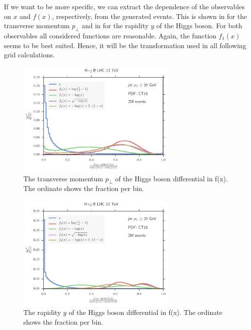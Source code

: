 If we want to be more specific, we can extract the dependence of the observables on $x$ and $f(x)$, respectively, from the generated events.
This is shown in  for the transverse momentum $p_\perp$ and in  for the rapidity $y$ of the Higgs boson.
For both observables all considered functions are reasonable.
Again, the function $f_1(x)$ seems to be best suited.
Hence, it will be the transformation used in all following grid calculations.
%
\begin{figure}[]
	\includegraphics[width=0.7\textwidth]{images/hpt_compare.pdf}
	\caption{The transverse momentum $p_\perp$ of the Higgs boson differential in f(x).
				The ordinate shows the fraction per bin.}
	\label{fig:hpt_compare}
\end{figure}
%
%
\begin{figure}[]
	\includegraphics[width=0.7\textwidth]{images/hy_compare.pdf}
	\caption{The rapidity $y$ of the Higgs boson differential in f(x).
				The ordinate shows the fraction per bin.}
	\label{fig:hy_compare}
\end{figure}
%
